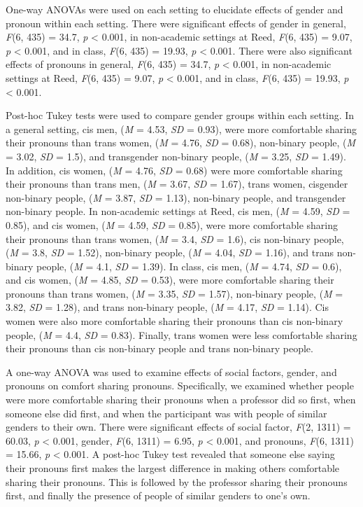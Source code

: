 \documentclass[12pt,twoside]{reedthesis}
\begin{document}
One-way ANOVAs were used on each setting to elucidate effects of gender and pronoun within each setting. There were significant effects of gender in general, \emph{F}(6, 435) = 34.7, \emph{p} \textless{} 0.001, in non-academic settings at Reed, \emph{F}(6, 435) = 9.07, \emph{p} \textless{} 0.001, and in class, \emph{F}(6, 435) = 19.93, \emph{p} \textless{} 0.001. There were also significant effects of pronouns in general, \emph{F}(6, 435) = 34.7, \emph{p} \textless{} 0.001, in non-academic settings at Reed, \emph{F}(6, 435) = 9.07, \emph{p} \textless{} 0.001, and in class, \emph{F}(6, 435) = 19.93, \emph{p} \textless{} 0.001.

Post-hoc Tukey tests were used to compare gender groups within each setting. In a general setting, cis men, (\emph{M} = 4.53, \emph{SD} = 0.93), were more comfortable sharing their pronouns than trans women, (\emph{M} = 4.76, \emph{SD} = 0.68), non-binary people, (\emph{M} = 3.02, \emph{SD} = 1.5), and transgender non-binary people, (\emph{M} = 3.25, \emph{SD} = 1.49). In addition, cis women, (\emph{M} = 4.76, \emph{SD} = 0.68) were more comfortable sharing their pronouns than trans men, (\emph{M} = 3.67, \emph{SD} = 1.67), trans women, cisgender non-binary people, (\emph{M} = 3.87, \emph{SD} = 1.13), non-binary people, and transgender non-binary people. In non-academic settings at Reed, cis men, (\emph{M} = 4.59, \emph{SD} = 0.85), and cis women, (\emph{M} = 4.59, \emph{SD} = 0.85), were more comfortable sharing their pronouns than trans women, (\emph{M} = 3.4, \emph{SD} = 1.6), cis non-binary people, (\emph{M} = 3.8, \emph{SD} = 1.52), non-binary people, (\emph{M} = 4.04, \emph{SD} = 1.16), and trans non-binary people, (\emph{M} = 4.1, \emph{SD} = 1.39). In class, cis men, (\emph{M} = 4.74, \emph{SD} = 0.6), and cis women, (\emph{M} = 4.85, \emph{SD} = 0.53), were more comfortable sharing their pronouns than trans women, (\emph{M} = 3.35, \emph{SD} = 1.57), non-binary people, (\emph{M} = 3.82, \emph{SD} = 1.28), and trans non-binary people, (\emph{M} = 4.17, \emph{SD} = 1.14). Cis women were also more comfortable sharing their pronouns than cis non-binary people, (\emph{M} = 4.4, \emph{SD} = 0.83). Finally, trans women were less comfortable sharing their pronouns than cis non-binary people and trans non-binary people.

A one-way ANOVA was used to examine effects of social factors, gender, and pronouns on comfort sharing pronouns. Specifically, we examined whether people were more comfortable sharing their pronouns when a professor did so first, when someone else did first, and when the participant was with people of similar genders to their own. There were significant effects of social factor, \emph{F}(2, 1311) = 60.03, \emph{p} \textless{} 0.001, gender, \emph{F}(6, 1311) = 6.95, \emph{p} \textless{} 0.001, and pronouns, \emph{F}(6, 1311) = 15.66, \emph{p} \textless{} 0.001. A post-hoc Tukey test revealed that someone else saying their pronouns first makes the largest difference in making others comfortable sharing their pronouns. This is followed by the professor sharing their pronouns first, and finally the presence of people of similar genders to one's own.
\end{document}
